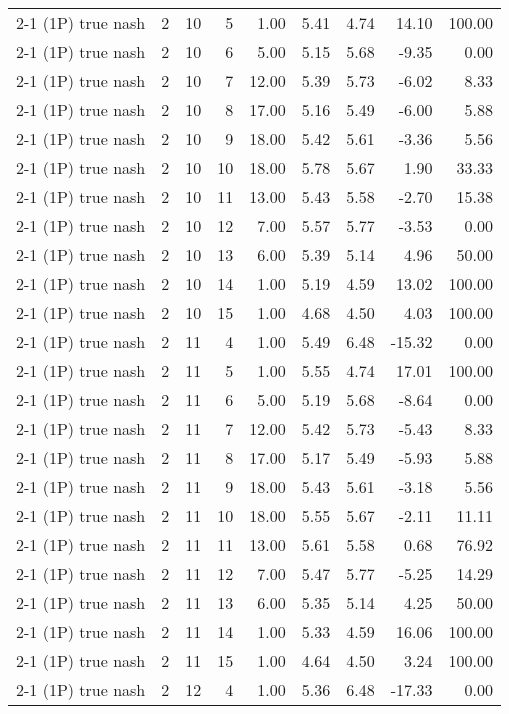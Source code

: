 \begin{tabular}{lrrrrrrrr}
2-1 (1P) true nash & 2 & 10 & 5 & 1.00 & 5.41 & 4.74 & 14.10 & 100.00 \\
2-1 (1P) true nash & 2 & 10 & 6 & 5.00 & 5.15 & 5.68 & -9.35 & 0.00 \\
2-1 (1P) true nash & 2 & 10 & 7 & 12.00 & 5.39 & 5.73 & -6.02 & 8.33 \\
2-1 (1P) true nash & 2 & 10 & 8 & 17.00 & 5.16 & 5.49 & -6.00 & 5.88 \\
2-1 (1P) true nash & 2 & 10 & 9 & 18.00 & 5.42 & 5.61 & -3.36 & 5.56 \\
2-1 (1P) true nash & 2 & 10 & 10 & 18.00 & 5.78 & 5.67 & 1.90 & 33.33 \\
2-1 (1P) true nash & 2 & 10 & 11 & 13.00 & 5.43 & 5.58 & -2.70 & 15.38 \\
2-1 (1P) true nash & 2 & 10 & 12 & 7.00 & 5.57 & 5.77 & -3.53 & 0.00 \\
2-1 (1P) true nash & 2 & 10 & 13 & 6.00 & 5.39 & 5.14 & 4.96 & 50.00 \\
2-1 (1P) true nash & 2 & 10 & 14 & 1.00 & 5.19 & 4.59 & 13.02 & 100.00 \\
2-1 (1P) true nash & 2 & 10 & 15 & 1.00 & 4.68 & 4.50 & 4.03 & 100.00 \\
2-1 (1P) true nash & 2 & 11 & 4 & 1.00 & 5.49 & 6.48 & -15.32 & 0.00 \\
2-1 (1P) true nash & 2 & 11 & 5 & 1.00 & 5.55 & 4.74 & 17.01 & 100.00 \\
2-1 (1P) true nash & 2 & 11 & 6 & 5.00 & 5.19 & 5.68 & -8.64 & 0.00 \\
2-1 (1P) true nash & 2 & 11 & 7 & 12.00 & 5.42 & 5.73 & -5.43 & 8.33 \\
2-1 (1P) true nash & 2 & 11 & 8 & 17.00 & 5.17 & 5.49 & -5.93 & 5.88 \\
2-1 (1P) true nash & 2 & 11 & 9 & 18.00 & 5.43 & 5.61 & -3.18 & 5.56 \\
2-1 (1P) true nash & 2 & 11 & 10 & 18.00 & 5.55 & 5.67 & -2.11 & 11.11 \\
2-1 (1P) true nash & 2 & 11 & 11 & 13.00 & 5.61 & 5.58 & 0.68 & 76.92 \\
2-1 (1P) true nash & 2 & 11 & 12 & 7.00 & 5.47 & 5.77 & -5.25 & 14.29 \\
2-1 (1P) true nash & 2 & 11 & 13 & 6.00 & 5.35 & 5.14 & 4.25 & 50.00 \\
2-1 (1P) true nash & 2 & 11 & 14 & 1.00 & 5.33 & 4.59 & 16.06 & 100.00 \\
2-1 (1P) true nash & 2 & 11 & 15 & 1.00 & 4.64 & 4.50 & 3.24 & 100.00 \\
2-1 (1P) true nash & 2 & 12 & 4 & 1.00 & 5.36 & 6.48 & -17.33 & 0.00 \\

\end{tabular}
